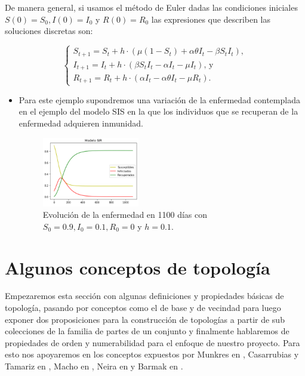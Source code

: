 De manera general, si usamos el método de Euler dadas las condiciones iniciales $S(0)=S_0,I(0)=I_0$ y $R(0)=R_0$ las expresiones que describen las soluciones discretas son:

$$\left\{\begin{array}{l}
S_{t+1} = S_t + h\cdot(\mu(1 - S_t) + \alpha\theta I_t - \beta S_t I_t), \\
I_{t+1} = I_t + h\cdot(\beta S_t I_t - \alpha I_t - \mu I_t)\text{, y} \\
R_{t+1} = R_t + h\cdot(\alpha I_t - \alpha\theta I_t - \mu R_t).
\end{array}\right.$$

\begin{itemize}
    \item Para este ejemplo supondremos una variación de la enfermedad contemplada en el ejemplo del modelo SIS en la que los individuos que se recuperan de la enfermedad adquieren inmunidad.
    
    \begin{figure}[h]
      \centering
        \includegraphics[width=0.4\textwidth]{Imagenes/ex1SIR.PNG}
      \caption{\centering Evolución de la enfermedad en 1100 días con $S_0=0.9,I_0=0.1,R_0=0$ y $h=0.1$.}
      \label{fig:Ejemplo 2 - SIR}
    \end{figure}
\end{itemize}

\section{Algunos conceptos de topología}\label{sec:Algunos conceptos de topología}

Empezaremos esta sección con algunas definiciones y propiedades básicas de topología, pasando por conceptos como el de base y de vecindad para luego exponer dos proposiciones para la construcción de topologías a partir de sub colecciones de la familia de partes de un conjunto y finalmente hablaremos de propiedades de orden y numerabilidad para el enfoque de nuestro proyecto. Para esto nos apoyaremos en los conceptos expuestos por Munkres en \cite{munkres}, Casarrubias y Tamariz en \cite{elementosTopologiaGeneral}, Macho en \cite{stadler2002}, Neira en \cite{NeiraNacional} y Barmak en \cite{barmak2011}.

